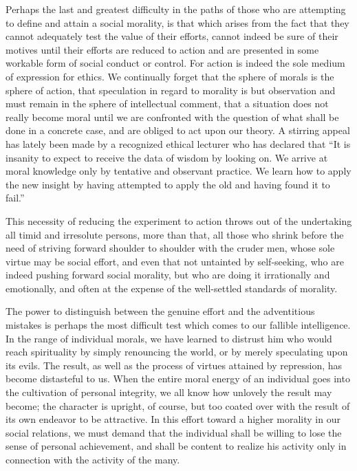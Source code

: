 \documentclass[]{article}
\begin{document}
\begin{sectionbody}
\addamsparagraph Perhaps the last and greatest difficulty in the paths of those who are
attempting to define and attain a social morality, is that which arises
from the fact that they cannot adequately test the value of their
efforts, cannot indeed be sure of their motives until their efforts are
reduced to action and are presented in some workable form of social
conduct or control. For action is indeed the sole medium of expression
for ethics. We continually forget that the sphere of morals is the
sphere of action, that speculation in regard to morality is but
observation and must remain in the sphere of intellectual comment, that
a situation does not really become moral until we are confronted with
the question of what shall be done in a concrete case, and are obliged
to act upon our theory. A stirring appeal has lately been made by a
recognized ethical lecturer who has declared that ``It is insanity to
expect to receive the data of wisdom by looking on. We arrive at moral
knowledge only by tentative and observant practice. We learn how to
apply the new insight by having attempted to apply the old and having
found it to fail.''

\addamsparagraph This necessity of reducing the experiment to action throws out of the
undertaking all timid and irresolute persons, more than that, all those
who shrink before the need of striving forward shoulder to shoulder with
the cruder men, whose sole virtue may be social effort, and even that
not untainted by self-seeking, who are indeed pushing forward social
morality, but who are doing it irrationally and emotionally, and often
at the expense of the well-settled standards of morality.

\addamsparagraph The power to distinguish between the genuine effort and the adventitious
mistakes is perhaps the most difficult test which comes to our fallible
intelligence. In the range of individual morals, we have learned to
distrust him who would reach spirituality by simply renouncing the
world, or by merely speculating upon its evils. The result, as well as
the process of virtues attained by repression, has become distasteful to
us. When the entire moral energy of an individual goes into the
cultivation of personal integrity, we all know how unlovely the result
may become; the character is upright, of course, but too coated over
with the result of its own endeavor to be attractive. In this effort
toward a higher morality in our social relations, we must demand that
the individual shall be willing to lose the sense of personal
achievement, and shall be content to realize his activity only in
connection with the activity of the many.


\end{sectionbody}
\end{document}
